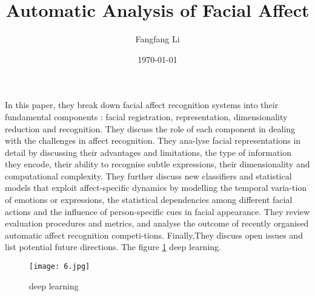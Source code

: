\documentclass[a4paper]{article}
\begin{document}
 \title{Automatic Analysis of Facial Affect}
\author{Fangfang Li}
\date{\today}
\maketitle
 \par In this paper, they break down facial affect recognition systems into their fundamental components : facial registration, representation, dimensionality reduction and recognition. They discuss the role of each component in dealing with the challenges in affect recognition. They ana-lyse facial representations in detail by discussing their advantages and limitations, the type of information they encode, their ability to recognise subtle expressions, their dimensionality and computational complexity. They further discuss new classifiers and statistical models that exploit affect-specific dynamics by modelling the temporal varia-tion of emotions or expressions, the statistical dependencies among different facial actions and the influence of person-specific cues in facial appearance.\cite{higham1994bibtex} They review evaluation procedures and metrics, and analyse the outcome of recently organised automatic affect recognition competi-tions. Finally,They discuss open issues and list potential future directions. The figure \ref{1} {\color{red} {deep learning}}.
\begin{figure}[!htp]
\centering
\texttt{[image: 6.jpg]}
\caption{{\color{red} {deep learning}}}
\label{1}
\end{figure}
\renewcommand\refname{Reference}

\end{document}
